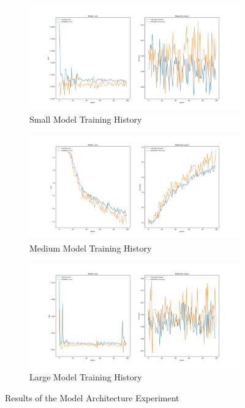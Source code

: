 \documentclass{l4proj}
\begin{document}
\begin{figure}[h]
	\begin{subfigure}{\textwidth}
		\centering
        \includegraphics[width=.8\linewidth]{eval/smallModelTrainingHistory}
        \caption{Small Model Training History}
        \label{fig:SmallModelExperiment}
	\end{subfigure}
	\begin{subfigure}{\textwidth}
		\centering
        \includegraphics[width=.8\linewidth]{eval/mediumModelTrainingHistory}
        \caption{Medium Model Training History}
        \label{fig:MediumModelExperiment}
	\end{subfigure}
	\begin{subfigure}{\textwidth}
		\centering
        \includegraphics[width=.8\linewidth]{eval/largeModelTrainingHistory}
        \caption{Large Model Training History}
        \label{fig:LargeModelExperiment}
	\end{subfigure}
	\caption{Results of the Model Architecture Experiment}
    \label{fig:ModelSizeResults}
\end{figure}
\end{document}
